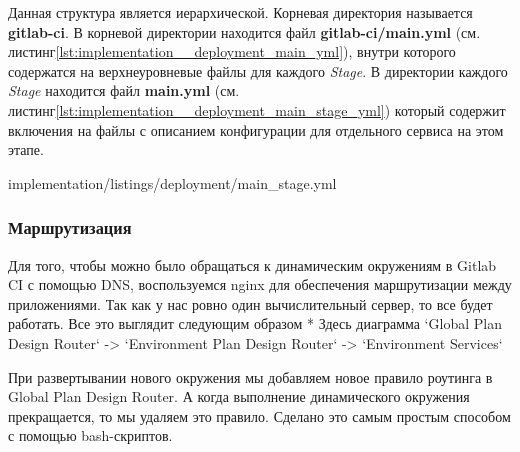 
Данная структура является иерархической.
Корневая директория называется \textbf{gitlab-ci}. В корневой директории находится файл \textbf{gitlab-ci/main.yml}
(см. листинг\ref{lst:implementation__deployment_main_yml}),
внутри которого содержатся на верхнеуровневые файлы для каждого \textit{Stage}.
В директории каждого \textit{Stage} находится файл \textbf{main.yml} (см. листинг\ref{lst:implementation__deployment_main_stage_yml})
который содержит включения на файлы
с описанием конфигурации для отдельного сервиса на этом этапе.


\vskip 5mm


{implementation/listings/deployment/main_stage.yml}
\vskip 5mm

\subsubsection{{Маршрутизация}}

Для того, чтобы можно было обращаться к динамическим окружениям в Gitlab CI с помощью DNS,
воспользуемся nginx для обеспечения маршрутизации между приложениями.
Так как у нас ровно один вычислительный сервер, то все будет работать.
Все это выглядит следующим образом
* Здесь диаграмма `Global Plan Design Router` -> `Environment Plan Design Router` -> `Environment Services`

При развертывании нового окружения мы добавляем новое правило роутинга в Global Plan Design Router.
А когда выполнение динамического окружения прекращается, то мы удаляем это правило.
Сделано это самым простым способом с помощью bash-скриптов.
